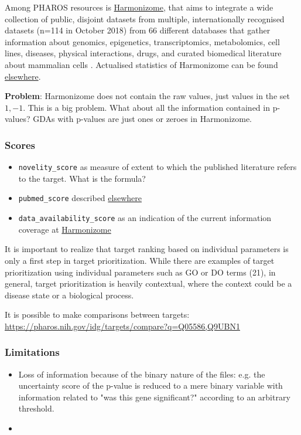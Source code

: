 Among PHAROS resources is \href{http://amp.pharm.mssm.edu/Harmonizome/about}{Harmonizome}, that aims to integrate a wide collection of public, disjoint datasets from multiple, internationally recognised datasets (n=114 in October 2018) from 66 different databases that gather information about genomics, epigenetics, transcriptomics, metabolomics, cell lines, diseases, physical interactions, drugs, and curated biomedical literature about mammalian cells \cite{harmonizome2016}. Actualised statistics of Harmonizome can be found \href{http://amp.pharm.mssm.edu/Harmonizome/about}{elsewhere}.

\textbf{Problem}: Harmonizome does not contain the raw values, just values in the set ${1,-1}$. This is a big problem. What about all the information contained in p-values? GDAs with p-values are just ones or zeroes in Harmonizome.

\subsubsection{Scores}

\begin{itemize}
    \item \texttt{novelity\_score} as measure of extent to which the published literature refers to the target. What is the formula?
    \item \texttt{pubmed\_score} described \href{https://pharos.nih.gov/idg/pmscore}{elsewhere}
    \item \texttt{data\_availability\_score} as an indication of the current information coverage at \href{http://amp.pharm.mssm.edu/Harmonizome/about}{Harmonizome}
\end{itemize}

It is important to realize that target ranking based on individual parameters is only a first step in target prioritization. While there are examples of target prioritization using individual parameters such as GO or DO terms (21), in general, target prioritization is heavily contextual, where the context could be a disease state or a biological process.

It is possible to make comparisons between targets: \url{https://pharos.nih.gov/idg/targets/compare?q=Q05586,Q9UBN1}

\subsubsection{Limitations}
\begin{itemize}
    \item Loss of information because of the binary nature of the files: e.g. the uncertainty score of the p-value is reduced to a mere binary variable with information related to "was this gene significant?" according to an arbitrary threshold.
    
    \item 
\end{itemize}